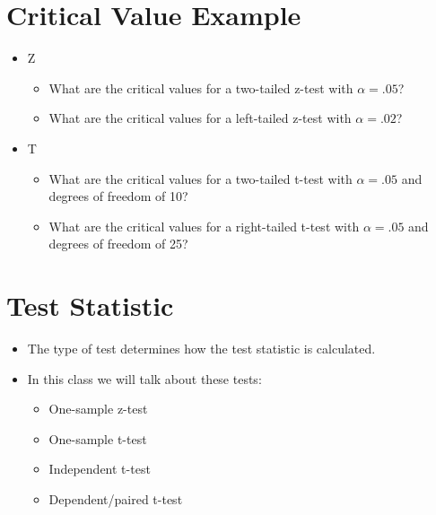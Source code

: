 \documentclass[12pt]{article}
\begin{document}
\section{Critical Value Example}\label{critical-value-example}

\begin{itemize}
\itemsep1pt\parskip0pt
\item
  Z

  \begin{itemize}
  \itemsep1pt\parskip0pt
  \item
    What are the critical values for a two-tailed z-test with
    \(\alpha = .05\)?
  \item
    What are the critical values for a left-tailed z-test with
    \(\alpha = .02\)?
  \end{itemize}
\item
  T

  \begin{itemize}
  \itemsep1pt\parskip0pt
  \item
    What are the critical values for a two-tailed t-test with
    \(\alpha = .05\) and degrees of freedom of 10?
  \item
    What are the critical values for a right-tailed t-test with
    \(\alpha = .05\) and degrees of freedom of 25?
  \end{itemize}
\end{itemize}

\section{Test Statistic}\label{test-statistic}

\begin{itemize}
\itemsep1pt\parskip0pt
\item
  The type of test determines how the test statistic is calculated.
\item
  In this class we will talk about these tests:

  \begin{itemize}
  \itemsep1pt\parskip0pt
  \item
    One-sample z-test
  \item
    One-sample t-test
  \item
    Independent t-test
  \item
    Dependent/paired t-test
  \end{itemize}
\end{itemize}
\end{document}
